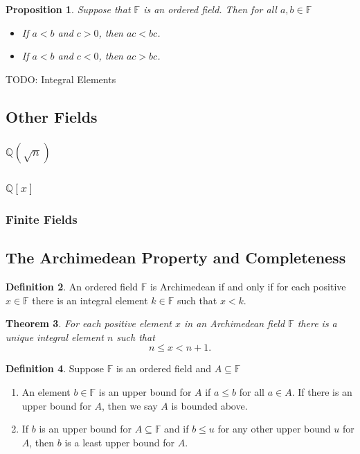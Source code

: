 \documentclass[11pt]{article}
\newtheorem{theorem}{Theorem}[section]
\newtheorem{proposition}[theorem]{Proposition}
\theoremstyle{definition}
\newtheorem{definition}[theorem]{Definition}
\begin{document}
\begin{proposition}
  Suppose that $\mathbb{F}$ is an ordered field. Then for all $a,b\in\mathbb{F}$
  \begin{itemize}
    \item[(a)] If $a<b$ and $c>0$, then $ac < bc$.
    \item[(b)] If $a< b$ and $c < 0$, then $ac > bc$.
  \end{itemize}
\end{proposition}

TODO: Integral Elements

\subsection{Other Fields}

\subsubsection{$\mathbb{Q}(\sqrt{n})$}

\subsubsection{$\mathbb{Q}[x]$}

\subsubsection{Finite Fields}

\subsection{The Archimedean Property and Completeness}

\begin{definition}
  An ordered field $\mathbb{F}$ is Archimedean if and only if for each positive $x\in\mathbb{F}$ there is an integral element $k\in\mathbb{F}$ such that $x < k$.
\end{definition}

\begin{theorem}
  For each positive element $x$ in an Archimedean field $\mathbb{F}$ there is a unique integral element $n$ such that
  \[ n \leq x < n + 1.\]
  \label{theorem: archimedean implies unique integral element}
\end{theorem}

\begin{definition}
  Suppose $\mathbb{F}$ is an ordered field and $A\subseteq \mathbb{F}$
  \begin{enumerate}
    \item[(a)] An element $b\in\mathbb{F}$ is an upper bound for $A$ if $a\leq b$ for all $a\in A$. If there is an upper bound for $A$, then 
      we say $A$ is bounded above.
    \item[(b)] If $b$ is an upper bound for $A\subseteq \mathbb{F}$ and if $b\leq u$ for any other upper bound $u$ for $A$, then $b$ is a least
      upper bound for $A$.
  \end{enumerate}
\end{definition}
\end{document}
